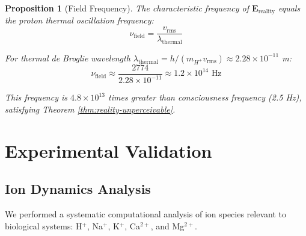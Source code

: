 \documentclass[12pt,a4paper]{article}
\newtheorem{proposition}[theorem]{Proposition}
\begin{document}
\begin{proposition}[Field Frequency]\label{prop:field-frequency}
The characteristic frequency of $\mathbf{E}_{\text{reality}}$ equals the proton thermal oscillation frequency:
\begin{equation}
\nu_{\text{field}} = \frac{v_{\text{rms}}}{\lambda_{\text{thermal}}}
\end{equation}

For thermal de Broglie wavelength $\lambda_{\text{thermal}} = h/(m_{H^+} v_{\text{rms}}) \approx 2.28 \times 10^{-11}$ m:
\begin{equation}
\nu_{\text{field}} \approx \frac{2774}{2.28 \times 10^{-11}} \approx 1.2 \times 10^{14} \text{ Hz}
\end{equation}

This frequency is $4.8 \times 10^{13}$ times greater than consciousness frequency (2.5 Hz), satisfying Theorem \ref{thm:reality-unperceivable}.
\end{proposition}

\section{Experimental Validation}

\subsection{Ion Dynamics Analysis}

We performed a systematic computational analysis of ion species relevant to biological systems: H$^+$, Na$^+$, K$^+$, Ca$^{2+}$, and Mg$^{2+}$.
\end{document}
